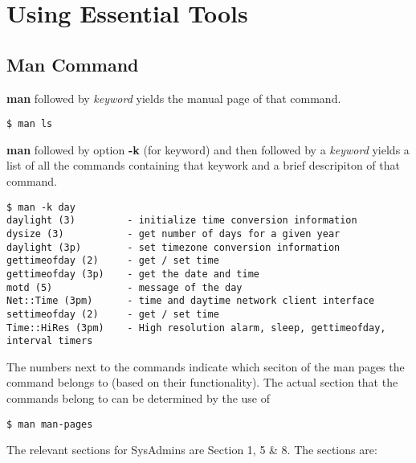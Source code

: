 \chapter{Using Essential Tools}
\section{Man Command}

\textbf{man} followed by \textit{keyword} yields the manual page of that command. 
\vspace{-20pt}
\begin{verbatim}
$ man ls
\end{verbatim}

\vspace{-15pt}
\noindent
\textbf{man} followed by option \textbf{-k} (for keyword) and then followed by a \textit{keyword} yields a list of all the commands containing that keywork and a brief descripiton of that command.
\vspace{-20pt} 
\begin{verbatim}
$ man -k day
daylight (3)         - initialize time conversion information
dysize (3)           - get number of days for a given year
daylight (3p)        - set timezone conversion information
gettimeofday (2)     - get / set time
gettimeofday (3p)    - get the date and time
motd (5)             - message of the day
Net::Time (3pm)      - time and daytime network client interface
settimeofday (2)     - get / set time
Time::HiRes (3pm)    - High resolution alarm, sleep, gettimeofday, interval timers
\end{verbatim}

\vspace{-15pt}
\noindent
The numbers next to the commands indicate which seciton of the man pages the command belongs to (based on their functionality). The actual section that the commands belong to can be determined by the use of 

\vspace{-20pt}
\begin{verbatim}
$ man man-pages
\end{verbatim}

\vspace{-15pt}
\noindent
The relevant sections for SysAdmins are Section 1, 5 \& 8. The sections are:

